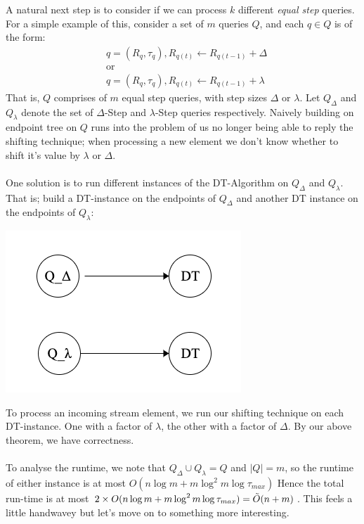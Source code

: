 \documentclass{article}
\begin{document}
A natural next step is to consider if we can process $k$ different \textit{equal step} queries. For a simple example of this, consider a set of $m$ queries $Q$, and each $q\in Q$ is of the form: 
\begin{align*}
    & q = (R_q, \tau_q), R_{q(t)}\leftarrow R_{q(t-1)}+\Delta \\
    & \text{or} \\
    & q = (R_q, \tau_q), R_{q(t)}\leftarrow R_{q(t-1)}+\lambda
\end{align*}
That is, $Q$ comprises of $m$ equal step queries, with step sizes $\Delta$ or $\lambda$. Let $Q_\Delta$ and $Q_\lambda$ denote the set of $\Delta$-Step and $\lambda$-Step queries respectively. Naively building on endpoint tree on $Q$ runs into the problem of us no longer being able to reply the shifting technique; when processing a new element we don't know whether to shift it's value by $\lambda$ or $\Delta$. \\
\\
One solution is to run different instances of the DT-Algorithm on $Q_\Delta$ and $Q_\lambda$. That is; build a DT-instance on the endpoints of $Q_\Delta$ and another DT instance on the endpoints of $Q_\lambda$: 
\begin{center}
    \includegraphics[scale=0.4]{images/DTinstances.png}
\end{center}
To process an incoming stream element, we run our shifting technique on each DT-instance. One with a factor of $\lambda$, the other with a factor of $\Delta$. By our above theorem, we have correctness. \\
\\
To analyse the runtime, we note that $Q_\Delta \cup Q_\lambda = Q$ and $|Q| = m$, so the runtime of either instance is at most $O(n\log m + m\log^2 m \log\tau_{max})$ Hence the total run-time is at most $2\times O(n\log m + m\log^2 m \log\tau_{max}) = \Tilde{O}(n+m)$. This feels a little handwavey but let's move on to something more interesting. \\
\end{document}
